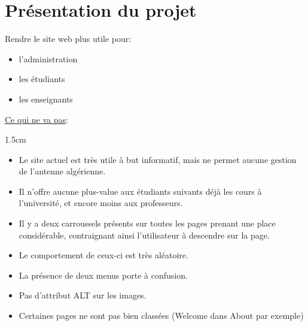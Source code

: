 \documentclass[oneside]{report}
\newcommand{\indentunder}{1.5cm}
\begin{document}
	\chapter{Présentation du projet}
	{
		\vspace{2cm}
		\par Rendre le site web plus utile pour:
		\begin{itemize}
			\item{l'administration}
			\item{les étudiants}
			\item{les enseignants}
		\end{itemize}
		\vspace{1cm}
		\par\underline{Ce qui ne va pas}:
		\vspace{.5cm}
		\begin{adjustwidth}{\indentunder}{}
		\begin{itemize}
			\item Le site actuel est très utile à but informatif, mais ne permet aucune gestion de l'antenne algérienne.
			\item Il n'offre aucune plus-value aux étudiants suivants déjà les cours à l'université, et encore moins aux professeurs.
			\item Il y a deux carroussels présents sur toutes les pages prenant une place considérable, contraignant ainsi l'utilisateur à descendre sur la page.
			\item Le comportement de ceux-ci est très aléatoire.
			\item La présence de deux menus porte à confusion.
			\item Pas d'attribut ALT sur les images.
			\item Certaines pages ne sont pas bien classées (Welcome dans About par exemple)
		\end{itemize}

\end{adjustwidth}}
\end{document}
